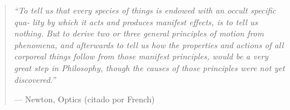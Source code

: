 \documentclass[]{IMTexam}
\author{Isabella B.}
\date{}
\begin{document}
\maketitle

\begin{quotation}
	\itshape ``To tell us that every species of things is endowed with an occult specific qua-
	lity by which it acts and produces manifest effects, is to tell us nothing. But
	to derive two or three general principles of motion from phenomena, and
	afterwards to tell us how the properties and actions of all corporeal things
	follow from those manifest principles, would be a very great step in Philosophy, though the causes of those principles were not yet discovered.''
	\par\raggedleft--- \textup{Newton}, Optics \textup{(citado por French)}
\end{quotation}
\end{document}
